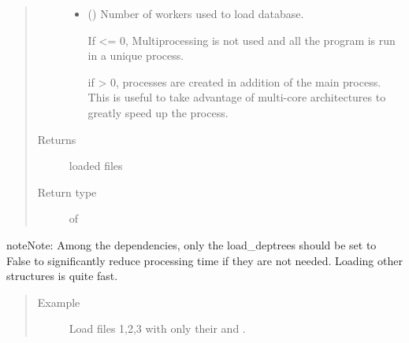 \documentclass[letterpaper,10pt,english]{sphinxmanual}
\begin{document}
\begin{fulllineitems}
\begin{quote}
\begin{description}
\begin{itemize}
\item {} 
 () \textendash{} 
Number of workers used to load database.

If  \textless{}= 0, Multiprocessing is not used and all the program is run in a unique process.

if  \textgreater{} 0,  processes are created in addition of the main process. This is useful to take
advantage of multi-core architectures to greatly speed up the process.


\end{itemize}

\item[{Returns}] \leavevmode
loaded files

\item[{Return type}] \leavevmode
{} of {\hyperref[\detokenize{classes:loacore.classes.classes.File}]{}}

\end{description}\end{quote}

\begin{sphinxadmonition}{note}{Note:}
Among the dependencies, only the load\_deptrees should be set to False to significantly reduce processing
time if they are not needed. Loading other structures is quite fast.
\end{sphinxadmonition}
\begin{quote}\begin{description}
\item[{Example}] \leavevmode
Load files 1,2,3 with only their  and .


\end{description}
\end{quote}
\end{fulllineitems}
\end{document}
